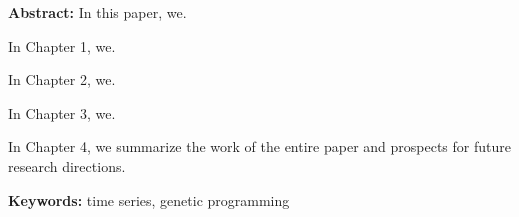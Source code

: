 \textbf{Abstract: }{\footnotesize In this paper, we.}

{\footnotesize In Chapter 1, we.}

{\footnotesize In Chapter 2, we.}

{\footnotesize In Chapter 3, we.}

{\footnotesize In Chapter 4, we summarize the work of the entire paper and prospects for future research directions.}

\textbf{Keywords: }{\footnotesize time series, genetic programming}